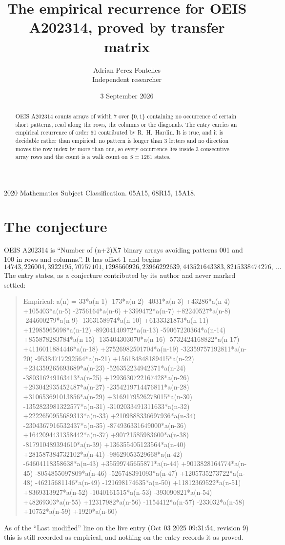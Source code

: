 \documentclass[11pt,a4paper]{article}
\title{The empirical recurrence for OEIS A202314, proved by transfer matrix}
\author{Adrian Perez Fontelles\\ \small Independent researcher}
\date{3 September 2026}
\theoremstyle{plain}
\theoremstyle{definition}
\begin{document}
\maketitle

\begin{abstract}
OEIS A202314 counts arrays of width $7$ over $\{0,1\}$ containing no occurrence of certain short
patterns, read along the rows, the columns or the diagonals. The entry carries an empirical
recurrence of order $60$ contributed by R.~H.~Hardin. It is true, and it is decidable
rather than empirical: no pattern is longer than $3$ letters and no direction moves the row
index by more than one, so every occurrence lies inside $3$ consecutive array rows and the
count is a walk count on $S=1261$ states.
\end{abstract}

\noindent\small 2020 Mathematics Subject Classification. 05A15, 68R15, 15A18.\normalsize

\section{The conjecture}

OEIS A202314 is ``Number of (n+2)X7 binary arrays avoiding patterns 001 and 100 in rows and columns.''. It has offset $1$ and begins
\[
14743, 226004, 3922195, 70757101, 1298560926, 23966292639, 443521643383, 8215338474276,\ \dots
\]
The entry states, as a conjecture contributed by its author and never marked settled:
\begin{quote}
Empirical: a(n) = 33*a(n-1) -173*a(n-2) -4031*a(n-3) +43286*a(n-4) +105403*a(n-5) -2756164*a(n-6) +3399472*a(n-7) +82240527*a(n-8) -244600279*a(n-9) -1363158974*a(n-10) +6133321873*a(n-11) +12985965698*a(n-12) -89204140972*a(n-13) -59067220364*a(n-14) +855878283784*a(n-15) -135404303070*a(n-16) -5732424168822*a(n-17) +4116011884446*a(n-18) +27526982501704*a(n-19) -32359757192811*a(n-20) -95384717292564*a(n-21) +156184848189415*a(n-22) +234359265693689*a(n-23) -526352234942371*a(n-24) -380316249163413*a(n-25) +1293630722167428*a(n-26) +293042935452487*a(n-27) -2354219714476811*a(n-28) +310653691013856*a(n-29) +3169179526278015*a(n-30) -1352823981322577*a(n-31) -3102033491311633*a(n-32) +2222650955689313*a(n-33) +2109888336697936*a(n-34) -2304367916532437*a(n-35) -874936331649000*a(n-36) +1642094431358442*a(n-37) +90721585983600*a(n-38) -817910489394610*a(n-39) +136355405123564*a(n-40) +281587384732102*a(n-41) -98629053529668*a(n-42) -64604118358638*a(n-43) +35599745655871*a(n-44) +9013828164774*a(n-45) -8054855097809*a(n-46) -526748391093*a(n-47) +1205735273722*a(n-48) -46215681146*a(n-49) -121698174635*a(n-50) +11812369522*a(n-51) +8369313927*a(n-52) -1040161515*a(n-53) -393090821*a(n-54) +48269303*a(n-55) +12317982*a(n-56) -1154412*a(n-57) -233032*a(n-58) +10752*a(n-59) +1920*a(n-60)
\end{quote}
As of the ``Last modified'' line on the live entry (Oct 03 2025 09:31:54, revision 9) this is still
recorded as empirical, and nothing on the entry records it as proved.
\end{document}

